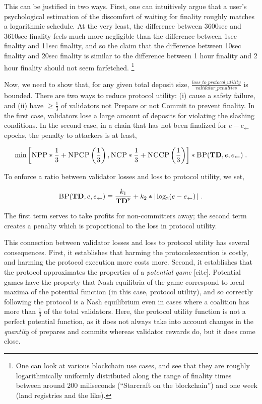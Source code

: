 \documentclass[12pt, final]{article}
\newcommand{\epoch}{\ensuremath{e}}
\newcommand{\BP}{\textsc{BP}\xspace}
\newcommand{\NCP}{\textsc{NCP}\xspace}
\newcommand{\NCCP}{\textsc{NCCP}\xspace}
\newcommand{\NPP}{\textsc{NPP}\xspace}
\newcommand{\NPCP}{\textsc{NPCP}\xspace}
\newcommand{\totaldeposit}{ \textbf{TD} \xspace}
\newcommand{\LFE}{ \ensuremath{\epoch_{\leftarrow}} \xspace}
\begin{document}
This can be justified in two ways. First, one can intuitively argue that a user's psychological estimation of the discomfort of waiting for finality roughly matches a logarithmic schedule. At the very least, the difference between 3600sec and 3610sec finality feels much more negligible than the difference between 1sec finality and 11sec finality, and so the claim that the difference between 10sec finality and 20sec finality is similar to the difference between 1 hour finality and 2 hour finality should not seem farfetched. \footnote{One can look at various blockchain use cases, and see that they are roughly logarithmically uniformly distributed along the range of finality times between around 200 miliseconds (``Starcraft on the blockchain'') and one week (land registries and the like). }

Now, we need to show that, for any given total deposit size, $\frac{loss\_to\_protocol\_utility}{validator\_penalties}$ is bounded. There are two ways to reduce protocol utility: (i) cause a safety failure, and (ii) have $\ge \frac{1}{3}$ of validators not Prepare or not Commit to prevent finality. In the first case, validators lose a large amount of deposits for violating the slashing conditions. In the second case, in a chain that has not been finalized for $\epoch - \LFE$ epochs, the penalty to attackers is at least,

\begin{equation}
\min \left[ \NPP * \frac{1}{3} + \NPCP\left(\frac{1}{3}\right), \NCP * \frac{1}{3} + \NCCP\left(\frac{1}{3}\right) \right] * \BP(\totaldeposit, \epoch, \LFE) \; .
\end{equation}

To enforce a ratio between validator losses and loss to protocol utility, we set,

\begin{equation}
\BP(\totaldeposit, \epoch, \LFE) \equiv \frac{k_1}{\totaldeposit^p} + k_2 * \lfloor \log_2(\epoch - \LFE) \rfloor\; .
\end{equation}

The first term serves to take profits for non-committers away; the second term creates a penalty which is proportional to the loss in protocol utility.

This connection between validator losses and loss to protocol utility has several consequences. First, it establishes that harming the protocolexecution is costly, and harming the protocol execution more costs more. Second, it establishes that the protocol approximates the properties of a \emph\emph{potential game} [cite]. Potential games have the property that Nash equilibria of the game correspond to local maxima of the potential function (in this case, protocol utility), and so correctly following the protocol is a Nash equilibrium even in cases where a coalition has more than $\frac{1}{3}$ of the total validators. Here, the protocol utility function is not a perfect potential function, as it does not always take into account changes in the \emph{quantity} of prepares and commits whereas validator rewards do, but it does come close.
\end{document}
